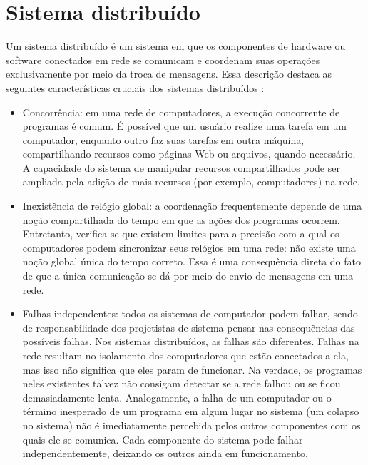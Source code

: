 \documentclass[12pt, %
openright, 
oneside, %
a4paper,    %
brazil]{facom-ufu-abntex2}
\begin{document}
\section{Sistema distribuído}

Um sistema distribuído é um sistema em que os componentes de hardware ou
software conectados em rede se comunicam e coordenam suas operações
exclusivamente por meio da troca de mensagens. Essa descrição destaca as
seguintes características cruciais dos sistemas distribuídos
\cite{coulouris2013sistemas}:

\begin{itemize}
	\item Concorrência: em uma rede de computadores, a execução concorrente
	      de programas é comum. É possível que um usuário realize uma tarefa em um
	      computador, enquanto outro faz suas tarefas em outra máquina, compartilhando
	      recursos como páginas Web ou arquivos, quando necessário. A capacidade do
	      sistema de manipular recursos compartilhados pode ser ampliada pela adição de
	      mais recursos (por exemplo, computadores) na rede.
	\item Inexistência de relógio global: a coordenação frequentemente
	      depende de uma noção compartilhada do tempo em que as ações dos programas
	      ocorrem. Entretanto, verifica-se que existem limites para a precisão com a qual
	      os computadores podem sincronizar seus relógios em uma rede: não existe uma
	      noção global única do tempo correto. Essa é uma consequência direta do fato de
	      que a única comunicação se dá por meio do envio de mensagens em uma rede.
	\item Falhas independentes: todos os sistemas de computador podem
	      falhar, sendo de responsabilidade dos projetistas de sistema pensar nas
	      consequências das possíveis falhas. Nos sistemas distribuídos, as falhas são
	      diferentes. Falhas na rede resultam no isolamento dos computadores que estão
	      conectados a ela, mas isso não significa que eles param de funcionar. Na
	      verdade, os programas neles existentes talvez não consigam detectar se a rede
	      falhou ou se ficou demasiadamente lenta. Analogamente, a falha de um computador
	      ou o término inesperado de um programa em algum lugar no sistema (um colapso no
	      sistema) não é imediatamente percebida pelos outros componentes com os quais
	      ele se comunica. Cada componente do sistema pode falhar independentemente,
	      deixando os outros ainda em funcionamento.
\end{itemize}
\end{document}

